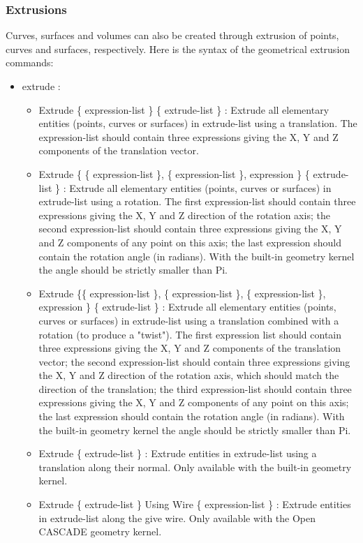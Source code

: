 \documentclass[dvipdfmx, 9pt, a4paper]{article}
\numberwithin{equation}{section}
\begin{document}
\subsubsection{Extrusions}
Curves, surfaces and volumes can also be created through extrusion of points, curves and surfaces, respectively. Here is the syntax of the geometrical extrusion commands:\\
\begin{itemize}
\item extrude :
\begin{itemize}
\item Extrude \{ expression-list \} \{ extrude-list \} : Extrude all elementary entities (points, curves or surfaces) in extrude-list using a
translation. The expression-list should contain three expressions giving the X, Y and Z components of the translation vector.
\item Extrude \{ \{ expression-list \}, \{ expression-list \}, expression \} \{ extrude-list \} : Extrude all elementary entities (points, curves or surfaces) in extrude-list using a rotation. The first expression-list should contain three expressions giving the X, Y and Z direction of the rotation axis; the second expression-list should contain three expressions giving the X, Y and Z components of any point on this axis; the last expression should contain the rotation angle (in radians). With the built-in geometry kernel the angle should be strictly smaller than Pi.
\item Extrude \{\{ expression-list \}, \{ expression-list \}, \{ expression-list \}, expression \} \{ extrude-list \} : Extrude all elementary entities (points, curves or surfaces) in extrude-list using a translation combined with a rotation (to produce a "twist"). The first expression list should contain three expressions giving the X, Y and Z components of the translation vector; the second expression-list should contain three expressions giving the X, Y and Z direction of the rotation axis, which should match the direction of the translation; the third expression-list should contain three expressions giving the X, Y and Z components of any point on this axis; the last expression should contain the rotation angle (in radians). With the built-in geometry kernel the angle should be strictly smaller than Pi.
\item Extrude \{ extrude-list \} : Extrude entities in extrude-list using a translation along their normal. Only available with the built-in geometry kernel.
\item Extrude \{ extrude-list \} Using Wire \{ expression-list \} : Extrude entities in extrude-list along the give wire. Only available with the Open CASCADE geometry kernel.

\end{itemize}
\end{itemize}
\end{document}
